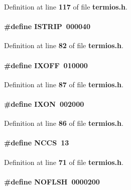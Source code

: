 Definition at line {\bf 117} of file {\bf termios.\+h}.

\paragraph[{I\+S\+T\+R\+IP}]{\setlength{\rightskip}{0pt plus 5cm}\#define I\+S\+T\+R\+IP~000040}\label{termios_8h_af9af65d3f6ca8f2ea3eecb1d06d5abd1}


Definition at line {\bf 82} of file {\bf termios.\+h}.

\paragraph[{I\+X\+O\+FF}]{\setlength{\rightskip}{0pt plus 5cm}\#define I\+X\+O\+FF~010000}\label{termios_8h_afdda6cad5fc4a9b67ba6dbe620065d91}


Definition at line {\bf 87} of file {\bf termios.\+h}.

\paragraph[{I\+X\+ON}]{\setlength{\rightskip}{0pt plus 5cm}\#define I\+X\+ON~002000}\label{termios_8h_a788d2780deb67c58ba8a049981a8161c}


Definition at line {\bf 86} of file {\bf termios.\+h}.

\paragraph[{N\+C\+CS}]{\setlength{\rightskip}{0pt plus 5cm}\#define N\+C\+CS~13}\label{termios_8h_a15cde8857ad26391c93358f528e7e13a}


Definition at line {\bf 71} of file {\bf termios.\+h}.

\paragraph[{N\+O\+F\+L\+SH}]{\setlength{\rightskip}{0pt plus 5cm}\#define N\+O\+F\+L\+SH~0000200}\label{termios_8h_a854ccd50bdc557d4898306555c491db3}


